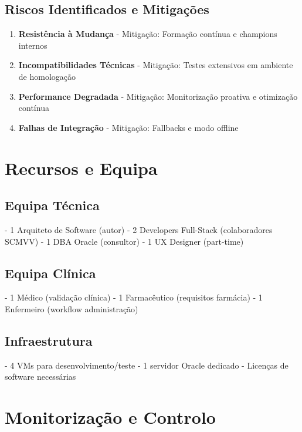 \subsection{Riscos Identificados e Mitigações}

\begin{enumerate}
    \item \textbf{Resistência à Mudança}
        - Mitigação: Formação contínua e champions internos
    
    \item \textbf{Incompatibilidades Técnicas}
        - Mitigação: Testes extensivos em ambiente de homologação
    
    \item \textbf{Performance Degradada}
        - Mitigação: Monitorização proativa e otimização contínua
    
    \item \textbf{Falhas de Integração}
        - Mitigação: Fallbacks e modo offline
\end{enumerate}

\section{Recursos e Equipa}

\subsection{Equipa Técnica}
- 1 Arquiteto de Software (autor)
- 2 Developers Full-Stack (colaboradores SCMVV)
- 1 DBA Oracle (consultor)
- 1 UX Designer (part-time)

\subsection{Equipa Clínica}
- 1 Médico (validação clínica)
- 1 Farmacêutico (requisitos farmácia)
- 1 Enfermeiro (workflow administração)

\subsection{Infraestrutura}
- 4 VMs para desenvolvimento/teste
- 1 servidor Oracle dedicado
- Licenças de software necessárias


\section{Monitorização e Controlo}

